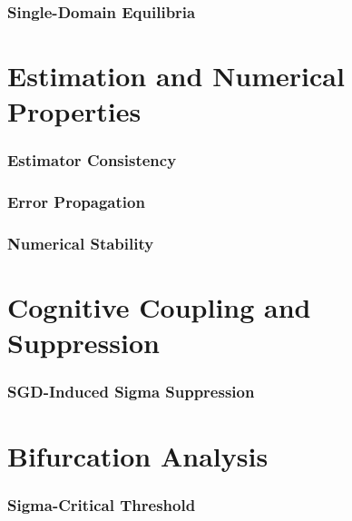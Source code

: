 \documentclass[manuscript,screen]{jair}
\begin{document}
\section{Single-Domain Equilibria}


\part{Estimation and Numerical Properties}

\section{Estimator Consistency}


\section{Error Propagation}


\section{Numerical Stability}


\part{Cognitive Coupling and Suppression}

\section{SGD-Induced Sigma Suppression}


\part{Bifurcation Analysis}

\section{Sigma-Critical Threshold}

\end{document}
